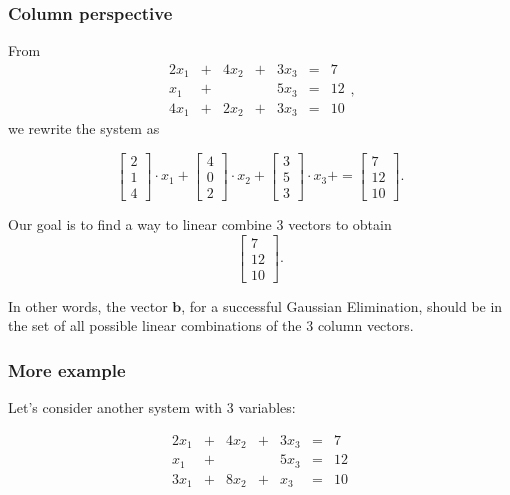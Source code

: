 \begin{frame}
  \frametitle{Column perspective}
  From
  {\tiny
  \[
  \begin{array}{rcrcrcl}
    2x_1 & + & 4x_2 & + & 3x_3 & = & 7 \\
    x_1 & + &  &  & 5x_3 & = & 12 \\
    4x_1 & + & 2x_2 & + & 3x_3 & = & 10
  \end{array},
  \]
  }
  we rewrite the system as

  \[
  \begin{bmatrix}
    2 \\ 1 \\ 4
  \end{bmatrix}
  \cdot x_1 +
  \begin{bmatrix}
    4 \\ 0 \\ 2
  \end{bmatrix}
  \cdot x_2 +
  \begin{bmatrix}
    3 \\ 5 \\ 3
  \end{bmatrix}
  \cdot x_3 +
  =
  \begin{bmatrix}
    7 \\ 12 \\ 10
  \end{bmatrix}.
  \]

  Our goal is to find a way to linear combine 3 vectors to obtain
  \[
  \begin{bmatrix}
    7 \\ 12 \\ 10
  \end{bmatrix}.
  \]

  \pause

  In other words, the vector ${\bm b}$, for a successful Gaussian
  Elimination, should be in the set of all possible linear combinations
  of the 3 column vectors.
\end{frame}

\begin{frame}
  \frametitle{More example}
  Let's consider another system with 3 variables:

  \[
  \begin{array}{rcrcrcl}
    2x_1 & + & 4x_2 & + & 3x_3 & = & 7 \\
    x_1 & + &  &  & 5x_3 & = & 12 \\
    3x_1 & + & 8x_2 & + & x_3 & = & 10
  \end{array}
  \]

  \vspace{2in}

\end{frame}

